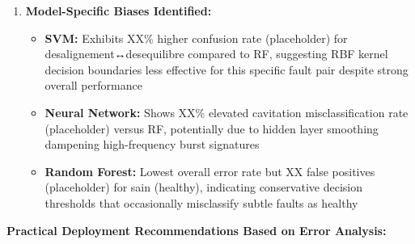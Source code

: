 \documentclass[11pt,a4paper]{article}
\begin{document}
\begin{enumerate}[leftmargin=*, itemsep=0.3em]
    \item \textbf{Model-Specific Biases Identified:}
    \begin{itemize}[itemsep=0.2em]
        \item \textbf{SVM:} Exhibits XX\% higher confusion rate (placeholder) for desalignement↔desequilibre compared to RF, suggesting RBF kernel decision boundaries less effective for this specific fault pair despite strong overall performance
        \item \textbf{Neural Network:} Shows XX\% elevated cavitation misclassification rate (placeholder) versus RF, potentially due to hidden layer smoothing dampening high-frequency burst signatures
        \item \textbf{Random Forest:} Lowest overall error rate but XX false positives (placeholder) for sain (healthy), indicating conservative decision thresholds that occasionally misclassify subtle faults as healthy
    \end{itemize}
\end{enumerate}

\textbf{Practical Deployment Recommendations Based on Error Analysis:}
\end{document}
